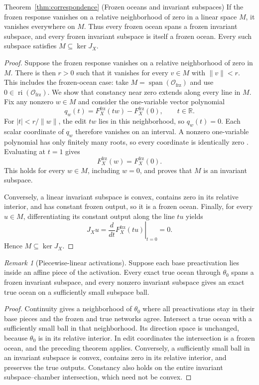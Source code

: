 \documentclass[twoside]{article}
\theoremstyle{remark}
\newtheorem{remark}[theorem]{Remark}
\DeclareMathOperator{\spanop}{span}
\DeclareMathOperator{\ri}{ri}
\newcommand{\R}{\mathbb R}
\newcommand{\frz}{\mathrm{frz}}
\theoremstyle{highlightdefinition}
\theoremstyle{remark}
\newcommand{\spn}{\spanop}
\begin{document}
\begin{restated}{Theorem~\ref{thm:correspondence} (Frozen oceans and invariant subspaces)}
If the frozen response vanishes on a relative neighborhood of zero in a linear space $M$, it vanishes everywhere on $M$. Thus every frozen ocean spans a frozen invariant subspace, and every frozen invariant subspace is itself a frozen ocean. Every such subspace satisfies $M\subseteq\ker J_X$.
\end{restated}
\begin{proof}
Suppose the frozen response vanishes on a relative neighborhood of zero in $M$. There is then $r>0$ such that it vanishes for every $v\in M$ with $\|v\|<r$. This includes the frozen-ocean case: take $M=\spn(\mathcal O_{\frz})$ and use $0\in\ri(\mathcal O_{\frz})$. We show that constancy near zero extends along every line in $M$.
Fix any nonzero $w\in M$ and consider the one-variable vector polynomial
\[
 q_w(t)=F_X^{\frz}(tw)-F_X^{\frz}(0),\qquad t\in\R.
\]
For $|t|<r/\|w\|$, the edit $tw$ lies in this neighborhood, so $q_w(t)=0$. Each scalar coordinate of $q_w$ therefore vanishes on an interval. A nonzero one-variable polynomial has only finitely many roots, so every coordinate is identically zero \citep{cox2015ideals}. Evaluating at $t=1$ gives
\[
 F_X^{\frz}(w)=F_X^{\frz}(0).
\]
This holds for every $w\in M$, including $w=0$, and proves that $M$ is an invariant subspace.

Conversely, a linear invariant subspace is convex, contains zero in its relative interior, and has constant frozen output, so it is a frozen ocean. Finally, for every $u\in M$, differentiating its constant output along the line $tu$ yields
\[
 J_Xu=\left.\frac{d}{dt}F_X^{\frz}(tu)\right|_{t=0}=0.
\]
Hence $M\subseteq\ker J_X$.
\end{proof}

\begin{remark}[Piecewise-linear activations]\label{rem:chamber-branch}
Suppose each base preactivation lies inside an affine piece of the activation. Every exact true ocean through $\theta_0$ spans a frozen invariant subspace, and every nonzero invariant subspace gives an exact true ocean on a sufficiently small subspace ball.
\end{remark}
\begin{proof}
Continuity gives a neighborhood of $\theta_0$ where all preactivations stay in their base pieces and the frozen and true networks agree. Intersect a true ocean with a sufficiently small ball in that neighborhood. Its direction space is unchanged, because $\theta_0$ is in its relative interior. In edit coordinates the intersection is a frozen ocean, and the preceding theorem applies. Conversely, a sufficiently small ball in an invariant subspace is convex, contains zero in its relative interior, and preserves the true outputs. Constancy also holds on the entire invariant subspace--chamber intersection, which need not be convex.
\end{proof}
\end{document}
